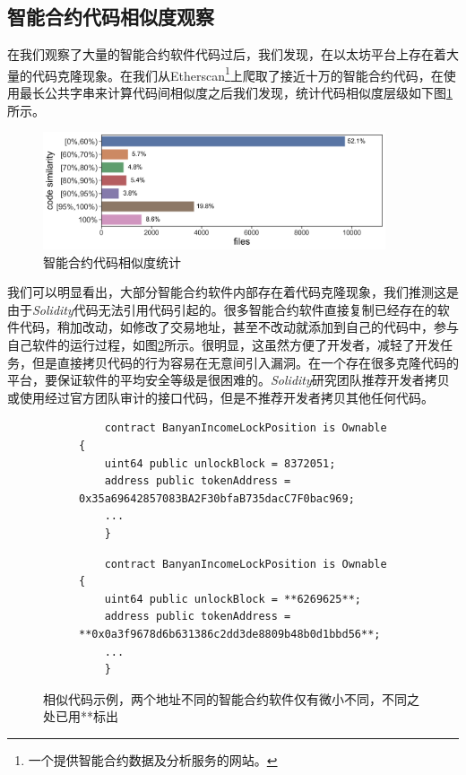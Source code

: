 \subsection{智能合约代码相似度观察}
在我们观察了大量的智能合约软件代码过后，我们发现，在以太坊平台上存在着大量的代码克隆现象。在我们从Etherscan\footnote{一个提供智能合约数据及分析服务的网站。}上爬取了接近十万的智能合约代码，在使用最长公共字串来计算代码间相似度之后我们发现，统计代码相似度层级如下图\ref{fig:similarity}所示。
\begin{figure}[htbp]
\vspace{+2mm}
  \centering
  \includegraphics[width=0.9\textwidth]{figures/similarity.png}
  \caption{智能合约代码相似度统计}
  \label{fig:similarity}
\vspace{-5mm}
\end{figure}
我们可以明显看出，大部分智能合约软件内部存在着代码克隆现象，我们推测这是由于\emph{Solidity}代码无法引用代码引起的。很多智能合约软件直接复制已经存在的软件代码，稍加改动，如修改了交易地址，甚至不改动就添加到自己的代码中，参与自己软件的运行过程，如图\ref{fig:similar_code}所示。很明显，这虽然方便了开发者，减轻了开发任务，但是直接拷贝代码的行为容易在无意间引入漏洞。在一个存在很多克隆代码的平台，要保证软件的平均安全等级是很困难的。\emph{Solidity}研究团队推荐开发者拷贝或使用经过官方团队审计的接口代码，但是不推荐开发者拷贝其他任何代码。
\begin{figure}[H]
    \centering
    \begin{subfigure}{\linewidth}
    \centering
    \begin{minipage}{1.0\linewidth}
    \begin{lstlisting}
    contract BanyanIncomeLockPosition is Ownable {
    uint64 public unlockBlock = 8372051;
    address public tokenAddress = 0x35a69642857083BA2F30bfaB735dacC7F0bac969;
    ...
    }
    \end{lstlisting}
    \end{minipage}
    \end{subfigure}
    \quad
    \begin{subfigure}{\linewidth}
    \centering
    \begin{minipage}{1.0\linewidth}
    \begin{lstlisting}
    contract BanyanIncomeLockPosition is Ownable {
    uint64 public unlockBlock = **6269625**;
    address public tokenAddress = **0x0a3f9678d6b631386c2dd3de8809b48b0d1bbd56**;
    ...
    }
    \end{lstlisting}
    \end{minipage}
    \end{subfigure}
    \caption{相似代码示例，两个地址不同的智能合约软件仅有微小不同，不同之处已用**标出}
    \label{fig:similar_code}
\end{figure}

